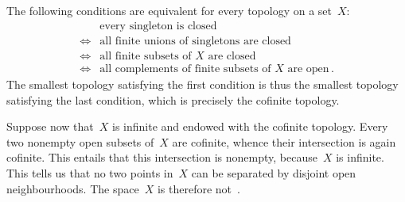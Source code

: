 \subsection{}

The following conditions are equivalent for every topology on a set~$X$:
\begin{align*}
	{}&
	\text{every singleton is closed}
	\\
	\iff{}&
	\text{all finite unions of singletons are closed}
	\\
	\iff{}&
	\text{all finite subsets of~$X$ are closed}
	\\
	\iff{}&
	\text{all complements of finite subsets of~$X$ are open} \,.
\end{align*}
The smallest topology satisfying the first condition is thus the smallest topology satisfying the last condition, which is precisely the cofinite topology.

Suppose now that~$X$ is infinite and endowed with the cofinite topology.
Every two nonempty open subsets of~$X$ are cofinite, whence their intersection is again cofinite.
This entails that this intersection is nonempty, because~$X$ is infinite.
This tells us that no two points in~$X$ can be separated by disjoint open neighbourhoods.
The space~$X$ is therefore not~.
